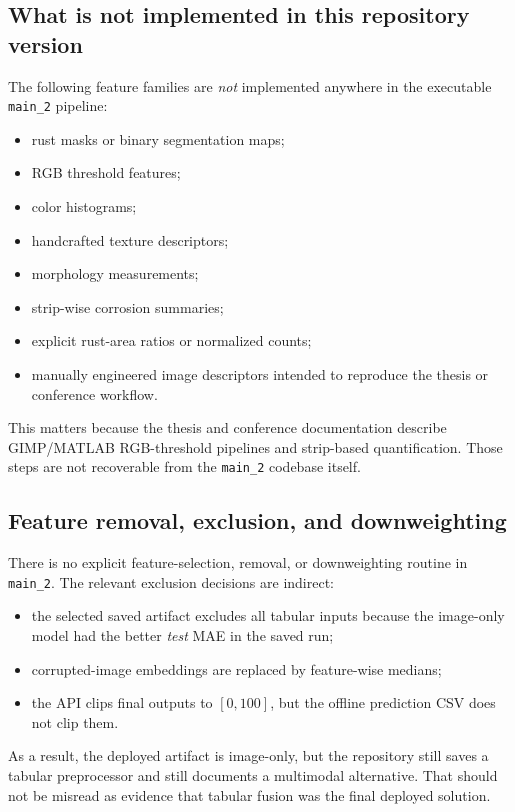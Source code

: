 \documentclass[11pt]{article}
\begin{document}
\subsection{What is not implemented in this repository version}
The following feature families are \emph{not} implemented anywhere in the executable \texttt{main\_2} pipeline:
\begin{itemize}
  \item rust masks or binary segmentation maps;
  \item RGB threshold features;
  \item color histograms;
  \item handcrafted texture descriptors;
  \item morphology measurements;
  \item strip-wise corrosion summaries;
  \item explicit rust-area ratios or normalized counts;
  \item manually engineered image descriptors intended to reproduce the thesis or conference workflow.
\end{itemize}

This matters because the thesis and conference documentation describe GIMP/MATLAB RGB-threshold pipelines and strip-based quantification. Those steps are not recoverable from the \texttt{main\_2} codebase itself.

\subsection{Feature removal, exclusion, and downweighting}
There is no explicit feature-selection, removal, or downweighting routine in \texttt{main\_2}. The relevant exclusion decisions are indirect:
\begin{itemize}
  \item the selected saved artifact excludes all tabular inputs because the image-only model had the better \emph{test} MAE in the saved run;
  \item corrupted-image embeddings are replaced by feature-wise medians;
  \item the API clips final outputs to \([0,100]\), but the offline prediction CSV does not clip them.
\end{itemize}

As a result, the deployed artifact is image-only, but the repository still saves a tabular preprocessor and still documents a multimodal alternative. That should not be misread as evidence that tabular fusion was the final deployed solution.
\end{document}
